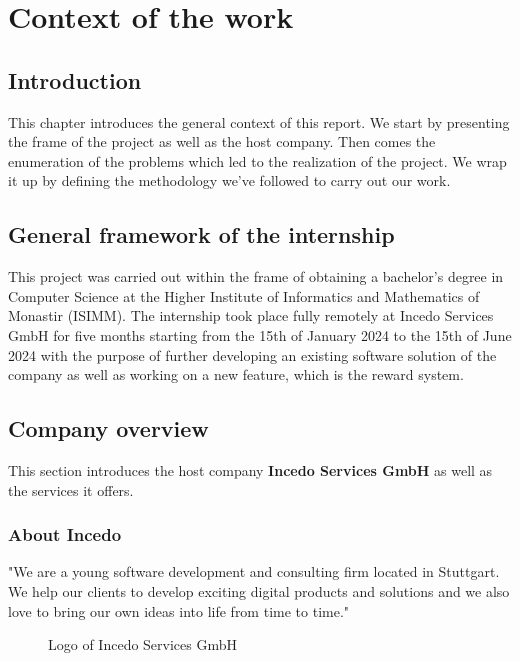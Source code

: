 \chapter{Context of the work}


\setcounter{secnumdepth}{0} %
\section{Introduction}
This chapter introduces the general context of this report.
We start by presenting the frame of the project as well as the host company.
Then comes the enumeration of the problems which led to the realization of the project.
We wrap it up by defining the methodology we’ve followed to carry out our work.

\setcounter{secnumdepth}{2} %
\section{General framework of the internship}
This project was carried out within the frame of obtaining a bachelor’s degree in Computer Science at the Higher Institute of Informatics and Mathematics of Monastir (ISIMM).
The internship took place fully remotely at Incedo Services GmbH for five months starting from the 15th of January 2024 to the 15th of June 2024 with the purpose of further developing an existing software solution of the company as well as working on a new feature, which is the reward system.

\section{Company overview}
This section introduces the host company {\bf Incedo Services GmbH} as well as the services it offers.
\subsection{About Incedo}
"We are a young software development and consulting firm located in Stuttgart.
We help our clients to develop exciting digital products and solutions and we also love to bring our own ideas into life from time to time." \cite{about-incedo}
\begin{figure}[H]
    \centering
    \caption{Logo of Incedo Services GmbH}
    \label{fig:logo-of-incedo}
\end{figure}

